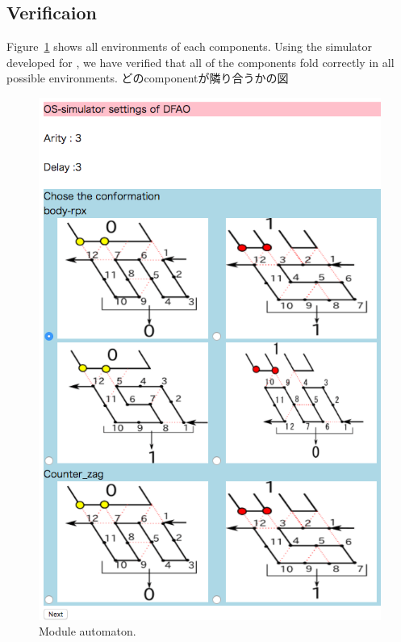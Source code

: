 \subsection{Verificaion}
Figure~\ref{fig:environments} shows all environments of each components.
Using the simulator developed for \cite{}, we have verified that all of the components fold correctly in all possible environments.
どのcomponentが隣り合うかの図


\begin{figure}[htb]
  \begin{center}
  \includegraphics[width=0.8\linewidth, height=0.8\linewidth]{pic/Co-zig1.png}
  \end{center}
\caption{Module automaton.}
\label{fig:environments}

\end{figure}


